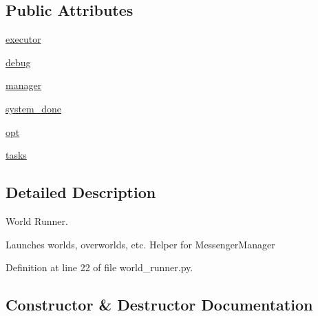 \subsection*{Public Attributes}
\begin{DoxyCompactItemize}
\item 
\hyperlink{classparlai_1_1messenger_1_1core_1_1world__runner_1_1MessengerWorldRunner_a05e0d84b563a68e0e8f8e7db515f5a49}{executor}
\item 
\hyperlink{classparlai_1_1messenger_1_1core_1_1world__runner_1_1MessengerWorldRunner_aa4c332359ed929318360fad48127974a}{debug}
\item 
\hyperlink{classparlai_1_1messenger_1_1core_1_1world__runner_1_1MessengerWorldRunner_a8b845c1bfc69c5026752634ab3df84e2}{manager}
\item 
\hyperlink{classparlai_1_1messenger_1_1core_1_1world__runner_1_1MessengerWorldRunner_a3bd04ed0186a27e1a6233ba827ce1196}{system\+\_\+done}
\item 
\hyperlink{classparlai_1_1messenger_1_1core_1_1world__runner_1_1MessengerWorldRunner_a5c024dadc50e64dca53b77118b644695}{opt}
\item 
\hyperlink{classparlai_1_1messenger_1_1core_1_1world__runner_1_1MessengerWorldRunner_a55237e6f296b0fddb24782427351f2cb}{tasks}
\end{DoxyCompactItemize}


\subsection{Detailed Description}
\begin{DoxyVerb}World Runner.

Launches worlds, overworlds, etc. Helper for MessengerManager
\end{DoxyVerb}
 

Definition at line 22 of file world\+\_\+runner.\+py.



\subsection{Constructor \& Destructor Documentation}
\mbox{\label{classparlai_1_1messenger_1_1core_1_1world__runner_1_1MessengerWorldRunner_a8923a9fe89c2f84c80c968a3d356b1ea}} 
